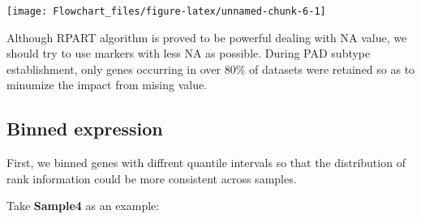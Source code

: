 \documentclass[
  12pt,
]{book}
\begin{document}
\begin{center}\texttt{[image: Flowchart\_files/figure-latex/unnamed-chunk-6-1]} \end{center}

Although RPART algorithm is proved to be powerful dealing with NA value, we should try to use markers with less NA as possible. During PAD subtype establishment, only genes occurring in over 80\% of datasets were retained so as to minumize the impact from mising value.

\hypertarget{binned-expression}{%
\subsection{Binned expression}\label{binned-expression}}

First, we binned genes with diffrent quantile intervals so that the distribution of rank information could be more consistent across samples.

Take \textbf{Sample4} as an example:
\end{document}
